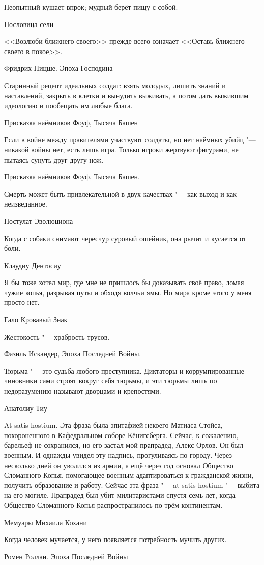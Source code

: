 \epigraph
{Неопытный кушает впрок;
мудрый берёт пищу с собой.}
{Пословица сели}

\epigraph
{<<Возлюби ближнего своего>> прежде всего означает <<Оставь ближнего своего в покое>>.}
{Фридрих Ницше.
Эпоха Господина}

\epigraph
{Старинный рецепт идеальных солдат: взять молодых, лишить знаний и наставлений, закрыть в клетки и вынудить выживать, а потом дать выжившим идеологию и пообещать им любые блага.}
{Присказка наёмников Фоуф, Тысяча Башен}

\epigraph
{Если в войне между правителями участвуют солдаты, но нет наёмных убийц "--- никакой войны нет, есть лишь игра.
Только игроки жертвуют фигурами, не пытаясь сунуть друг другу нож.}
{Присказка наёмников Фоуф, Тысяча Башен.}

\epigraph
{Смерть может быть привлекательной в двух качествах "--- как выход и как неизведанное.}
{Постулат Эволюциона}

\epigraph
{Когда с собаки снимают чересчур суровый ошейник, она рычит и кусается от боли.}
{Клаудиу Дентосиу}

\epigraph
{Я бы тоже хотел мир, где мне не пришлось бы доказывать своё право, ломая чужие копья, разрывая путы и обходя волчьи ямы.
Но мира кроме этого у меня просто нет.}
{Гало Кровавый Знак}

\epigraph
{Жестокость "--- храбрость трусов.}
{Фазиль Искандер, Эпоха Последней Войны.}

\epigraph
{Тюрьма "--- это судьба любого преступника.
Диктаторы и коррумпированные чиновники сами строят вокруг себя тюрьмы, и эти тюрьмы лишь по недоразумению называют дворцами и крепостями.}
{Анатолиу Тиу}

\epigraph
{At satis hostium.
Эта фраза была эпитафией некоего Матиаса Стойса, похороненного в Кафедральном соборе Кёнигсберга.
Сейчас, к сожалению, барельеф не сохранился, но его застал мой прапрадед, Алекс Орлов.
Он был военным.
И однажды увидел эту надпись, прогуливаясь по городу.
Через несколько дней он уволился из армии, а ещё через год основал Общество Сломанного Копья, помогающее военным адаптироваться к гражданской жизни, получить образование и работу.
Сейчас эта фраза "--- at satis hostium "--- выбита на его могиле.
Прапрадед был убит милитаристами спустя семь лет, когда Общество Сломанного Копья распространилось по трём континентам.}
{Мемуары Михаила Кохани}

\epigraph
{Когда человек мучается, у него появляется потребность мучить других.}
{Ромен Роллан.
Эпоха Последней Войны}

